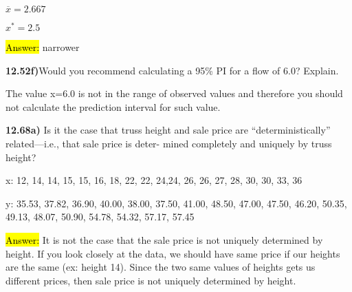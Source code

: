 \documentclass{article}
\begin{document}
\vspace{2mm}

$\overline{x}=2.667$

\vspace{2mm}

$x^{*}=2.5$


\vspace{2mm}

\hl{Answer:} narrower


\vspace{5mm}

\textbf{12.52f)}Would you recommend calculating a 95\% PI for a flow of 6.0? Explain.

\vspace{2mm}

The value x=6.0 is not in the range of observed values and therefore you should not calculate the prediction interval for such value. 

  









\newpage
\textbf{12.68a)} Is it the case that truss height and sale price are “deterministically” related—i.e., that sale price is deter- mined completely and uniquely by truss height?

\vspace{3mm}


x: 12, 14, 14, 15, 15, 16, 18, 22, 22, 24,24, 26, 26, 27, 28, 30, 30, 33, 36

\vspace{3mm}

y: 35.53, 37.82, 36.90, 40.00, 38.00, 37.50, 41.00, 48.50, 47.00, 47.50, 46.20, 50.35, 49.13, 48.07, 50.90, 54.78, 54.32, 57.17, 57.45

\vspace{3mm}


\hl{Answer:} It is not the case that the sale price is not uniquely determined by height. If you look closely at the data, we should have same price if our heights are the same (ex: height 14). Since the two same values of heights gets us different prices, then sale price is not uniquely determined by height.
\end{document}
